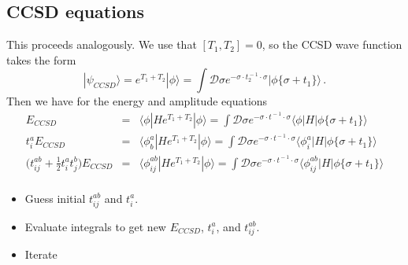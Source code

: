 \documentclass[12pt]{article}
\begin{document}
\subsection{CCSD equations}
This proceeds analogously. We use that $[T_1,T_2]=0$, so the CCSD wave function takes the form
\begin{equation}
|\psi_{CCSD}\rangle = e^{T_1+T_2}|\phi\rangle = \int \mathcal{D}\sigma e^{-\sigma\cdot t_2^{\!-1}\cdot\sigma} |\phi\{\sigma + t_1\}\rangle\,.
\end{equation}
Then we have for the energy and amplitude equations
\begin{eqnarray}
E_{CCSD} &=& \langle\phi|He^{T_1+T_2}|\phi\rangle = \int \mathcal{D}\sigma e^{-\sigma\cdot t^{\!-1}\cdot\sigma}\langle\phi|H|\phi\{\sigma+t_1\}\rangle\\
t^{a}_i E_{CCSD}&=& \langle\phi^{a}_b|He^{T_1+T_2}|\phi\rangle = \int \mathcal{D}\sigma e^{-\sigma\cdot t^{\!-1}\cdot\sigma}\langle\phi^{a}_i|H|\phi\{\sigma+t_1\}\rangle\\
\bigl(t^{ab}_{ij}+\frac{1}{2}t^{a}_{i}t^{b}_{j}\bigr)E_{CCSD} &=& \langle\phi^{ab}_{ij}|He^{T_1+T_2}|\phi\rangle  = \int \mathcal{D}\sigma  e^{-\sigma\cdot t^{\!-1}\cdot\sigma}\langle\phi^{ab}_{ij}|H|\phi\{\sigma+t_1\}\rangle\nonumber\\
\end{eqnarray}

\begin{itemize}
\item Guess initial $t^{ab}_{ij}$ and $t^{a}_i$.
\item Evaluate integrals to get new $E_{CCSD}$, $t^{a}_i$, and $t^{ab}_{ij}$. 
\item Iterate
\end{itemize}
\end{document}
